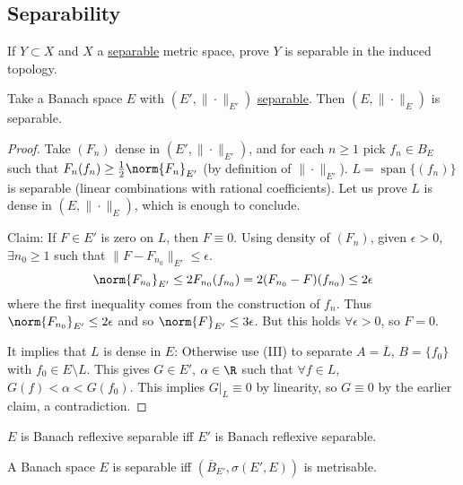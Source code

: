 \documentclass[twoside]{article}
\DeclareMathOperator{\spn}{span}
\begin{document}
\subsection{Separability}
\begin{ex}
    If $Y \subset X$ and $X$ a \hyperlink{def:separable}{separable} metric space, prove $Y$ is separable in the induced topology.
\end{ex}
\begin{prop}
  Take a Banach space $E$ with $(E', \|\cdot\|_{E'})$ \hyperlink{def:separable}{separable}. Then $(E, \|\cdot\|_{E})$ is separable.
\end{prop}
\begin{proof}
  Take $(F_n)$ dense in $(E', \|\cdot\|_{E'})$, and for each $n \geq 1$ pick $f_n \in B_E$ such that $F_n(f_n) \geq \frac{1}{2} \norm{F_n}_{E'}$ (by definition of $\|\cdot\|_{E'}$).
  $L = \spn \{(f_n)\}$ is separable (linear combinations with rational coefficients). Let us prove $L$ is dense in $(E, \|\cdot\|_E)$, which is enough to conclude.

  Claim: If $F \in E'$ is zero on $L$, then $F \equiv 0$. Using density of $(F_n)$, given $\epsilon > 0$, $\exists n_0 \geq 1$ such that $\|F - F_{n_0}\|_{E'} \leq \epsilon$.
    \begin{equation*}
        \norm{F_{n_0}}_{E'} \leq 2 F_{n_0} (f_{n_0}) = 2 (F_{n_0} - F)(f_{n_0}) \leq 2\epsilon
    \end{equation*}
    where the first inequality comes from the construction of $f_n$.
    Thus $\norm{F_{n_0}}_{E'} \leq 2 \epsilon$ and so $\norm{F}_{E'} \leq 3 \epsilon$. But this holds $\forall \epsilon > 0$, so $F = 0$.

    It implies that $L$ is dense in $E$:
    Otherwise use  (III) to separate $A = \overline{L}$, $B = \{f_0\}$ with $f_0 \in E \setminus L$.
    This gives $G \in E'$, $\alpha \in \R$ such that $\forall f \in L$, $G(f) < \alpha < G(f_0)$.
    This implies $G|_L \equiv 0$ by linearity, so $G \equiv 0$ by the earlier claim, a contradiction.
\end{proof}
\begin{ex}
    $E$ is Banach reflexive separable iff $E'$ is Banach reflexive separable.
\end{ex}
\begin{prop}
    A Banach space $E$ is separable iff $(\overline{B}_{E'}, \sigma(E', E))$ is metrisable.
\end{prop}
\end{document}
